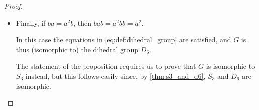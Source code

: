 \begin{proof}
\begin{itemize}
\begin{itemize}
      Clearly \( (ab)^6 = e \). Then \( 6 \) is the smallest power of \( ab \) that gives \( e \), i.e. the order of \( ab \). Then \( ab \) generates \( G \), and \cref{thm:cyclic_monoid_classification/finite_group} implies that \( G \) is isomorphic to \( C_6 \).

      \item Finally, if \( ba = a^2 b \), then \( bab = a^2 bb = a^2 \).

      In this case the equations in \eqref{eq:def:dihedral_group} are satisfied, and \( G \) is thus (isomorphic to) the dihedral group \( D_6 \).

      The statement of the proposition requires us to prove that \( G \) is isomorphic to \( S_3 \) instead, but this follows easily since, by \cref{thm:s3_and_d6}, \( S_3 \) and \( D_6 \) are isomorphic.
    \end{itemize}
  \end{itemize}
\end{proof}
